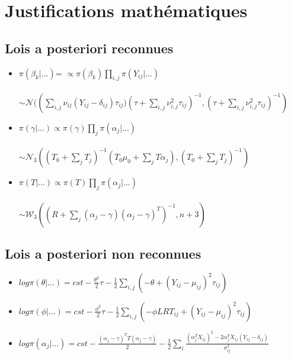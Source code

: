  \section{Justifications mathématiques}
 
   \subsection{Lois a posteriori reconnues}

    \begin{itemize}
    
        \item 
        $\pi(\beta_k | ...)$= $ \propto \pi(\beta_k) \prod_{i,j} \pi(Y_{ij}|...)$ \\  
        \\
        $\sim \mathcal{N}((\sum_{i,j}{ \nu_{ij}(Y_{ij} - \delta_{ij}) \tau_{ij})}(\tau + \sum_{i,j}{ \nu_{i,j}^2 \tau_{ij}})^{-1} , (\tau + \sum_{i,j} \nu_{i,j}^2 \tau_{ij})^{-1})$

        
        \item $\pi(\gamma|...) \propto \pi(\gamma) \prod_j \pi(\alpha_j|...)$  
        \\
        \\
        $\sim \mathcal{N}_3 ((T_0 + \sum_j T_j)^{-1}(T_0 \mu_0 + \sum_j T \alpha_j) , (T_0 + \sum_j T_j)^{-1})$
        
        \item $\pi(T|...) \propto \pi(T) \prod_j \pi(\alpha_j|...)$ 
        \\
        \\
        $\sim \mathcal{W}_3((R+\sum_j(\alpha_j - \gamma)(\alpha_j - \gamma)^T)^{-1} , n+3)$
        
    \end{itemize}
    
    
    
   \subsection{Lois a posteriori non reconnues}

    \begin{itemize}
    
        \item $log \pi(\theta|...) = cst - \frac{\theta^2}{2}\tau - \frac{1}{2}\sum_{i,j}(-\theta + (Y_{ij}-\mu_{ij})^2 \tau_{ij})$
        
        \item $log \pi(\phi|...) = cst - \frac{\phi^2}{2}\tau - \frac{1}{2}\sum_{i,j}(-\phi LRT_{ij} + (Y_{ij}-\mu_{ij})^2 \tau_{ij})$
        
        \item $log \pi(\alpha_j |...) = cst - \frac{(\alpha_j - \gamma)^T T (\alpha_j - \gamma)}{2} - \frac{1}{2} \sum_i \frac{(\alpha_j^T X_{ij})^2 - 2\alpha_j^T X_{ij} (Y_{ij} - \delta_{ij})}{\sigma_{ij}^2}$
        
    \end{itemize}
